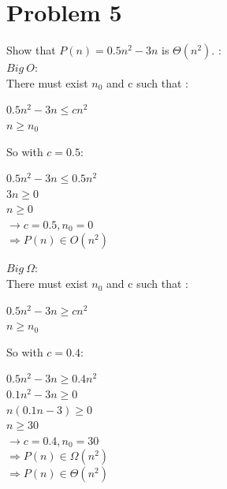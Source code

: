\documentclass{report}
\newcommand\tab[1][1cm]{\hspace*{#1}}
\begin{document}
    \section*{\huge Problem 5}
        Show that $P(n) = 0.5n^2 - 3n$  is $\Theta(n^2).$ : \\
        \tab $Big\ O:$\\
        \tab There must exist $n_0$ and c such that :
        \begin{center}
            $0.5n^2 - 3n \leq cn^2$\\
            \large $n \geq n_0$
        \end{center}
        \tab So with $c = 0.5 : $
        \begin{center}
            $0.5n^2 - 3n \leq 0.5n^2$\\
            $3n \geq 0$\\
            $n \geq 0$\\
            \large $\rightarrow c = 0.5, n_0  = 0$\\
            \Large $\Rightarrow P(n) \in O(n^2)$
        \end{center}
        \tab $Big\ \Omega:$\\
        \tab There must exist $n_0$ and c such that :
        \begin{center}
            $0.5n^2 - 3n \geq cn^2$\\
            \large $n \geq n_0$
        \end{center}
        \tab So with $c = 0.4 : $
        \begin{center}
            $0.5n^2 - 3n \geq 0.4n^2$\\
            $0.1n^2 - 3n \geq 0$\\
            $n(0.1n - 3) \geq 0$\\
            $n \geq 30$\\
            \large $\rightarrow c = 0.4, n_0 = 30$\\
            \Large $\Rightarrow P(n) \in \Omega(n^2)$ \\
            \huge $\Rightarrow P(n) \in \Theta(n^2)$
        \end{center}
\end{document}
